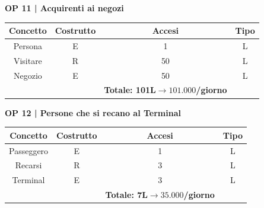 \textbf{\small OP 11 | Acquirenti ai negozi}\\

\begin{tabular}{ c c c c}
	\hline
	\rowcolor{airforceblue}
	\textbf{\color{white}Concetto} & \textbf{\color{white}Costrutto} & \textbf{\color{white}Accesi} & \textbf{\color{white}Tipo}\\
	\hline
	\textsf{\small Persona} & \textsf{\small E} & \textsf{\small 1} &  \textsf{\small L}\\
	\hline
	\textsf{\small Visitare} & \textsf{\small R} & \textsf{\small 50} &  \textsf{\small L}\\
	\hline
	\textsf{\small Negozio} & \textsf{\small E} & \textsf{\small 50} &  \textsf{\small L}\\
	\hline
	\rowcolor{airforceblue}
	\textsf{\small } & \textsf{\small } & \textbf{\color{white}Totale: 101L$\rightarrow 101.000$/giorno } \textsf{\small } & \textsf{\small }\\ %
	\hline
\end{tabular}

\vspace{.6cm}


\textbf{\small OP 12 | Persone che si recano al Terminal}\\

\begin{tabular}{ c c c c}
	\hline
	\rowcolor{airforceblue}
	\textbf{\color{white}Concetto} & \textbf{\color{white}Costrutto} & \textbf{\color{white}Accesi} & \textbf{\color{white}Tipo}\\
	\hline
	\textsf{\small Passeggero} & \textsf{\small E} & \textsf{\small 1} &  \textsf{\small L}\\
	\hline
	\textsf{\small Recarsi} & \textsf{\small R} & \textsf{\small 3} &  \textsf{\small L}\\
	\hline
	\textsf{\small Terminal} & \textsf{\small E} & \textsf{\small 3} &  \textsf{\small L}\\
	\hline
	\hline
	\rowcolor{airforceblue}
	\textsf{\small } & \textsf{\small } & \textbf{\color{white}Totale: 7L$\rightarrow 35.000$/giorno } \textsf{\small } & \textsf{\small }\\ %
	\hline
\end{tabular}

